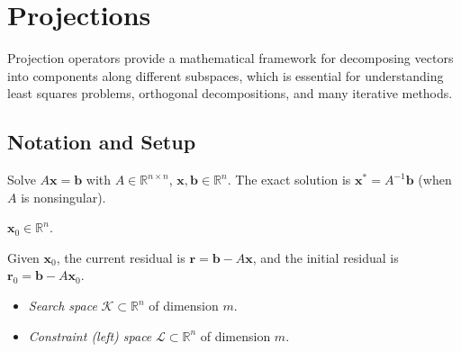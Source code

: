 \documentclass[../../main.tex]{subfiles}
\begin{document}
\chapter{Projections}\label{chap:projections}

Projection operators provide a mathematical framework for decomposing vectors into components along different subspaces, which is essential for understanding least squares problems, orthogonal decompositions, and many iterative methods.

\section{Notation and Setup}
\begin{description}[style=nextline, labelwidth=5cm, leftmargin=5.5cm, font=\normalfont\bfseries]
    \item[Linear system.] Solve \(A\mathbf{x}=\mathbf{b}\) with \(A \in \mathbb{R}^{n\times n}\), \(\mathbf{x},\mathbf{b} \in \mathbb{R}^n\). The exact solution is \(\mathbf{x}^{\ast}  = A^{-1}\mathbf{b}\) (when \(A\) is nonsingular).
    \item[Initial guess.] \(\mathbf{x}_0 \in \mathbb{R}^n\).
    \item[Residuals.] Given \(\mathbf{x}_0\), the current residual is \(\mathbf{r} = \mathbf{b} - A \mathbf{x}\), and the initial residual is \(\mathbf{r}_0 = \mathbf{b} - A \mathbf{x}_0\).
    \item[Subspaces.]
          \begin{itemize}
              \item \emph{Search space} \(\mathcal{K}\subset\mathbb{R}^n\) of dimension \(m\).
              \item \emph{Constraint (left) space} \(\mathcal{L}\subset\mathbb{R}^n\) of dimension \(m\).
          \end{itemize}


\end{description}
\end{document}
